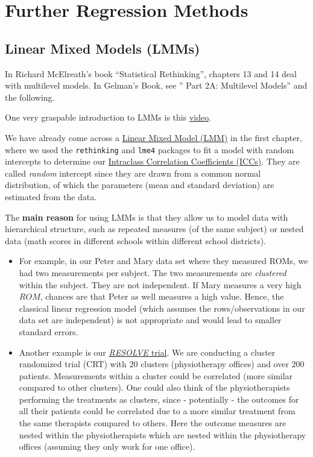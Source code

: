 \documentclass[
]{book}
\begin{document}
\chapter{Further Regression Methods}\label{further-regression-methods}

\section{Linear Mixed Models (LMMs)}\label{linear-mixed-models-lmms}

In Richard McElreath's book ``Statistical Rethinking'',
chapters 13 and 14 deal with multilevel models.
In Gelman's Book, see '' Part 2A: Multilevel Models'' and the following.

One very graspable introduction to LMMs is this
\href{https://www.youtube.com/watch?v=QCqF-2E86r0&ab_channel=MatthewE.Clapham}{video}.

We have already come across a \href{https://en.wikipedia.org/wiki/Mixed_model}{Linear Mixed Model (LMM)}
in the first chapter, where we used the \texttt{rethinking} and \texttt{lme4} packages to fit a model with
random intercepts to determine our
\href{https://jdegenfellner.github.io/Script_QM3_ZHAW/reliability-and-validity.html\#ICC}{Intraclass Correlation Coefficients (ICCs)}.
They are called \emph{random} intercept since they are drawn from a common normal distribution,
of which the parameters (mean and standard deviation) are estimated from the data.

The \textbf{main reason} for using LMMs is that they allow us to model data
with hierarchical structure, such as repeated measures (of the same subject)
or nested data (math scores in different schools within different school districts).

\begin{itemize}
\item
  For example, in our Peter and Mary data set where they measured
  ROMs, we had two measurements per subject. The two measurements
  are \emph{clustered} within the subject.
  They are not independent. If Mary measures a very high \(ROM\), chances are that
  Peter as well measures a high value. Hence, the classical linear regression
  model (which assumes the rows/observations in our data set are independent)
  is not appropriate and would lead to smaller standard errors.
\item
  Another example is our \href{https://www.zhaw.ch/en/research/project/74535}{\emph{RESOLVE} trial}.
  We are conducting a
  cluster randomized trial (CRT) with \(20\) clusters (physiotherapy offices)
  and over \(200\) patients. Measurements within a cluster
  could be correlated (more similar compared to other clusters).
  One could also think of the physiotherapists performing
  the treatments as clusters, since - potentially - the outcomes
  for all their patients could be correlated due to a more similar
  treatment from the same therapists compared to others.
  Here the outcome measures are nested within the physiotherapists which
  are nested within the physiotherapy offices
  (assuming they only work for one office).
\end{itemize}
\end{document}
